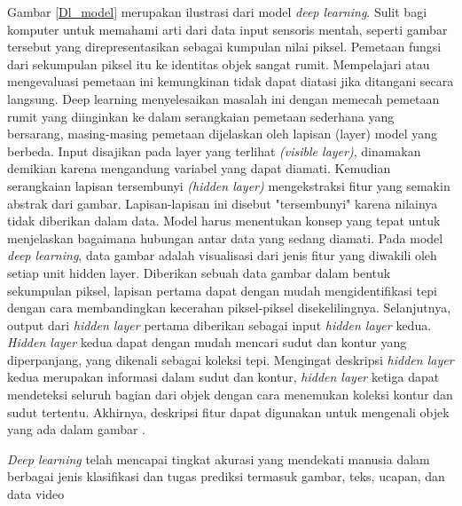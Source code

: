 \documentclass[../thesis.tex]{subfiles}
\begin{document}
Gambar \ref{Dl_model} merupakan ilustrasi dari model \textit{deep learning}. Sulit bagi komputer untuk memahami arti dari data input sensoris mentah, seperti gambar tersebut yang direpresentasikan
sebagai kumpulan nilai piksel. Pemetaan fungsi dari sekumpulan piksel itu ke identitas objek sangat rumit. Mempelajari atau mengevaluasi pemetaan ini kemungkinan tidak dapat diatasi jika
ditangani secara langsung. Deep learning menyelesaikan masalah ini dengan memecah pemetaan rumit yang diinginkan ke dalam serangkaian pemetaan sederhana yang bersarang, masing-masing
pemetaan dijelaskan oleh lapisan (layer) model yang berbeda. Input disajikan pada layer yang terlihat \textit{(visible layer)}, dinamakan demikian karena mengandung variabel yang dapat diamati.
Kemudian serangkaian lapisan tersembunyi \textit{(hidden layer)} mengekstraksi fitur yang semakin abstrak dari gambar. Lapisan-lapisan ini disebut "tersembunyi" karena nilainya tidak diberikan
dalam data. Model harus menentukan konsep yang tepat untuk menjelaskan bagaimana hubungan antar data yang sedang diamati. Pada model \textit{deep learning}, data gambar adalah visualisasi dari 
jenis fitur yang diwakili oleh setiap unit hidden layer. Diberikan sebuah data gambar dalam bentuk sekumpulan piksel, lapisan pertama dapat dengan mudah mengidentifikasi tepi dengan cara
membandingkan kecerahan piksel-piksel disekelilingnya. Selanjutnya, output dari \textit{hidden layer} pertama diberikan sebagai input \textit{hidden layer} kedua. \textit{Hidden layer} kedua dapat dengan mudah
mencari sudut dan kontur yang diperpanjang, yang dikenali sebagai koleksi tepi. Mengingat deskripsi \textit{hidden layer} kedua merupakan informasi dalam sudut dan kontur, \textit{hidden layer} ketiga
dapat mendeteksi seluruh bagian dari objek dengan cara menemukan koleksi kontur dan sudut tertentu. Akhirnya, deskripsi fitur dapat digunakan untuk mengenali objek yang ada dalam gambar
\cite{DLConcept}.

\textit{Deep learning} telah mencapai tingkat akurasi yang mendekati manusia dalam berbagai jenis klasifikasi dan tugas prediksi termasuk
gambar, teks, ucapan, dan data video \cite{CODL2018}
\end{document}
